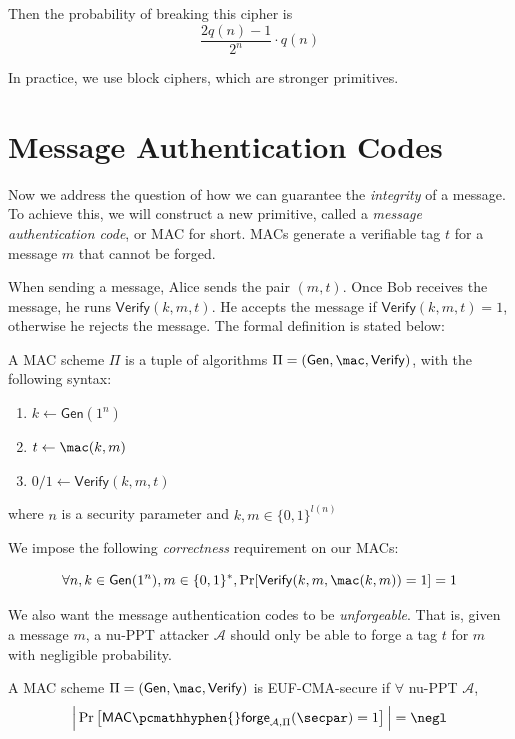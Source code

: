 \documentclass[12pt]{tufte-book}
\newcommand{\ma}{\mathcal{A}}
\newcommand{\cA}{\mathcal{A}}
\newcommand{\gen}{\mathsf{Gen}}
\newcommand{\Verify}{\mathsf{Verify}}
\begin{document}
Then the probability of breaking this cipher is
$$\frac{2q(n) - 1}{2^n} \cdot q(n)$$

In practice, we use block ciphers, which are stronger primitives.

\section{Message Authentication Codes}
Now we address the question of how we can guarantee the \textit{integrity} of a message.
To achieve this, we will construct a new primitive, called a \textit{message authentication code}, or MAC for short. MACs generate a verifiable tag $t$ for a message $m$ that cannot be forged.

When sending a message, Alice sends the pair $(m, t)$.
Once Bob receives the message, he runs $\Verify(k, m, t)$.
He accepts the message if $\Verify(k, m, t) = 1$, otherwise he rejects the message.
The formal definition is stated below:
\begin{definition}
    A MAC scheme $\Pi$ is a tuple of algorithms $\Pi = (\gen, \mac, \Verify)$, with the following syntax:
    \begin{enumerate}
        \item $k \leftarrow \gen(1^n)$
        \item $t \leftarrow \mac(k,m)$
        \item $0/1 \leftarrow \Verify(k, m, t)$
    \end{enumerate}
    where $n$ is a security parameter and $k, m \in \{0, 1\}^{l(n)}$
\end{definition}

We impose the following \textit{correctness} requirement on our MACs:
\begin{definition}
    $$\forall n, k \in \gen(1^n), m \in \{0, 1\}^*, \Pr[\Verify(k, m, \mac(k, m)) = 1] = 1$$
\end{definition}

We also want the message authentication codes to be \textit{unforgeable}.
That is, given a message $m$, a nu-PPT attacker $\ma$ should only be able to forge a tag $t$ for $m$ with negligible probability.
\begin{definition}
    A MAC scheme $\Pi = (\gen,\mac,\Verify)$ is EUF-CMA-secure if $\forall$ nu-PPT $\ma$,
    $$\Big| \Pr\left[\mathsf{MAC}\pcmathhyphen{}\mathsf{forge}_{\cA, \Pi}(\secpar) =1\right]\Big| = \negl$$
\end{definition}
\end{document}
